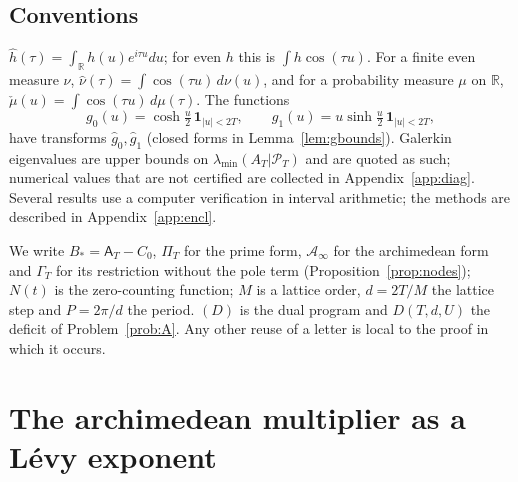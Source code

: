 \documentclass[11pt]{amsart}
\theoremstyle{definition}
\theoremstyle{remark}
\newcommand{\R}{\mathbb R}
\newcommand{\PT}{\mathcal P_T}
\newcommand{\lamA}{\lambda_{\min}(A_T|\PT)}
\newcommand{\gh}[1]{\widehat g_{#1}}
\newcommand{\nuh}{\widehat\nu}
\newcommand{\Aconst}{\mathsf A_T}
\newcommand{\Ainf}{\mathcal A_\infty}
\newcommand{\PiT}{\Pi_T}
\begin{document}
\subsection{Conventions}
$\widehat h(\tau)=\int_\R h(u)e^{i\tau u}du$; for even $h$ this is $\int h\cos(\tau u)$. For a
finite even measure $\nu$, $\nuh(\tau)=\int\cos(\tau u)\,d\nu(u)$, and for a probability measure
$\mu$ on $\R$, $\check\mu(u)=\int\cos(\tau u)\,d\mu(\tau)$. The functions
\begin{equation}\label{eq:g}
g_0(u)=\cosh\tfrac u2\,\mathbf 1_{|u|<2T},\qquad g_1(u)=u\sinh\tfrac u2\,\mathbf 1_{|u|<2T},
\end{equation}
have transforms $\gh0,\gh1$ (closed forms in Lemma~\ref{lem:gbounds}). Galerkin eigenvalues are
upper bounds on $\lamA$ and are quoted as such; numerical values that are not certified are collected
in Appendix~\ref{app:diag}. Several results use a computer verification in interval arithmetic; the
methods are described in Appendix~\ref{app:encl}.

We write $B_*=\Aconst-C_0$, $\PiT$ for the prime form, $\Ainf$ for the archimedean form and $\Gamma_T$
for its restriction without the pole term (Proposition~\ref{prop:nodes}); $N(t)$ is the zero-counting
function; $M$ is a lattice order, $d=2T/M$ the lattice step and $P=2\pi/d$ the period. $(D)$ is the
dual program and $D(T,d,U)$ the deficit of Problem~\ref{prob:A}. Any other reuse of a letter is
local to the proof in which it occurs.



\section{The archimedean multiplier as a L\'evy exponent}\label{sec:levy}
\end{document}
